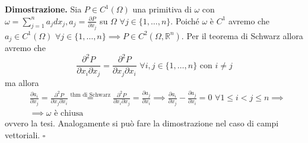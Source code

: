 \noindent \textbf{Dimostrazione. }
Sia $P \in C^1(\Omega)$ una primitiva di $\omega$ con $\omega = \sum\limits_{j=1}^n a_j dx_j, a_j = \frac{\partial P}{\partial x_j}$ su $\Omega \, \, \forall j \in \{1, \ldots, n \}$. Poiché
$\omega$ è $C^1$ avremo che $a_j \in C^1(\Omega) \, \, \forall j \in \{1, \ldots, n \} \implies P \in C^2(\Omega, \mathbb{R}^n)$. Per il teorema di Schwarz allora avremo che
$$
\frac{\partial^2 P}{\partial x_i \partial x_j} = \frac{\partial^2 P}{\partial x_j \partial x_i} \, \, \forall i, j \in \{1, \ldots, n \} \text{ con } i \neq j
$$
ma allora
\begin{align*}
&\frac{\partial a_i}{\partial x_j} = \frac{\partial^2 P}{\partial x_j \partial x_i} \stackrel{\text{thm di Schwarz}}{=} \frac{\partial^2 P}{\partial x_i \partial x_j} = \frac{\partial a_j}{\partial x_i} \implies \frac{\partial a_i}{\partial x_j} - \frac{\partial a_j}{\partial x_i} = 0 \, \, \forall 1 \leq i < j \leq n \implies \\
&\implies \omega \text{ è chiusa }
\end{align*}
ovvero la tesi. Analogamente si può fare la dimostrazione nel caso di campi vettoriali.
\hfill $\square$

